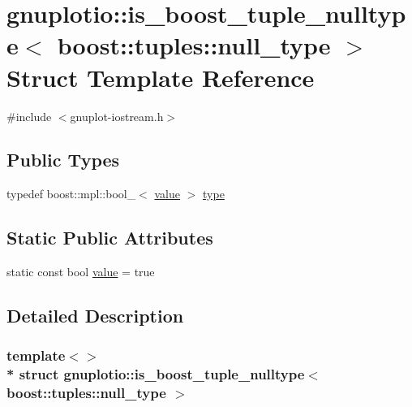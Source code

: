 \hypertarget{structgnuplotio_1_1is__boost__tuple__nulltype_3_01boost_1_1tuples_1_1null__type_01_4}{}\section{gnuplotio\+:\+:is\+\_\+boost\+\_\+tuple\+\_\+nulltype$<$ boost\+:\+:tuples\+:\+:null\+\_\+type $>$ Struct Template Reference}
\label{structgnuplotio_1_1is__boost__tuple__nulltype_3_01boost_1_1tuples_1_1null__type_01_4}


{\ttfamily \#include $<$gnuplot-\/iostream.\+h$>$}

\subsection*{Public Types}
\begin{DoxyCompactItemize}
\item 
typedef boost\+::mpl\+::bool\+\_\+$<$ \hyperlink{structgnuplotio_1_1is__boost__tuple__nulltype_3_01boost_1_1tuples_1_1null__type_01_4_ae7fc5c63a7b01851c7ce12dbf634cfea}{value} $>$ \hyperlink{structgnuplotio_1_1is__boost__tuple__nulltype_3_01boost_1_1tuples_1_1null__type_01_4_aab5c47dbae2148f1e9ed4d89f25f21fd}{type}
\end{DoxyCompactItemize}
\subsection*{Static Public Attributes}
\begin{DoxyCompactItemize}
\item 
static const bool \hyperlink{structgnuplotio_1_1is__boost__tuple__nulltype_3_01boost_1_1tuples_1_1null__type_01_4_ae7fc5c63a7b01851c7ce12dbf634cfea}{value} = true
\end{DoxyCompactItemize}


\subsection{Detailed Description}
\subsubsection*{template$<$$>$\\*
struct gnuplotio\+::is\+\_\+boost\+\_\+tuple\+\_\+nulltype$<$ boost\+::tuples\+::null\+\_\+type $>$}



